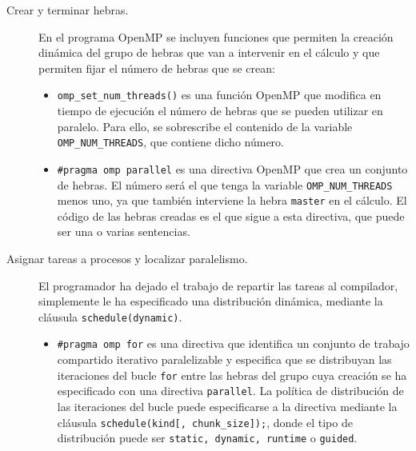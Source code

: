 \begin{description}
    \item [Crear y terminar hebras.] En el programa OpenMP se incluyen funciones que permiten la creación dinámica del grupo de hebras que van a intervenir en el cálculo y que permiten fijar el número de hebras que se crean:
        \begin{itemize}
            \item \verb|omp_set_num_threads()| es una función OpenMP que modifica en tiempo de ejecución el número de hebras que se pueden utilizar en paralelo. Para ello, se sobrescribe el contenido de la variable \verb|OMP_NUM_THREADS|, que contiene dicho número.
            \item \verb|#pragma omp parallel| es una directiva OpenMP que crea un conjunto de hebras. El número será el que tenga la variable \verb|OMP_NUM_THREADS| menos uno, ya que también interviene la hebra \verb|master| en el cálculo. El código de las hebras creadas es el que sigue a esta directiva, que puede ser una o varias sentencias.
        \end{itemize}
    \item [Asignar tareas a procesos y localizar paralelismo.] El programador ha dejado el trabajo de repartir las tareas al compilador, simplemente le ha especificado una distribución dinámica, mediante la cláusula \verb|schedule(dynamic)|.
        \begin{itemize}
            \item \verb|#pragma omp for| es una directiva que identifica un conjunto de trabajo compartido iterativo paralelizable y especifica que se distribuyan las iteraciones del bucle \verb|for| entre las hebras del grupo cuya creación se ha especificado con una directiva \verb|parallel|. La política de distribución de las iteraciones del bucle puede especificarse a la directiva mediante la cláusula \verb|schedule(kind[, chunk_size]);|, donde el tipo de distribución puede ser \verb|static, dynamic, runtime| o \verb|guided|.


\end{itemize}
\end{description}
